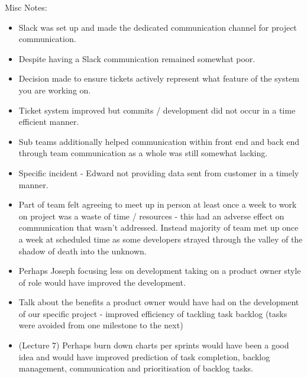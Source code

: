 \documentclass{l3proj}
\begin{document}
Misc Notes:
\begin{itemize}
\item Slack was set up and made the dedicated communication channel for project communication.
\item Despite having a Slack communication remained somewhat poor.
\item Decision made to ensure tickets actively represent what feature of the system you are working on.
\item Ticket system improved but commits / development did not occur in a time efficient manner.
\item Sub teams additionally helped communication within front end and back end through team communication as a whole was still somewhat lacking.
\item Specific incident - Edward not providing data sent from customer in a timely manner.
\item Part of team felt agreeing to meet up in person at least once a week to work on project was a waste of time / resources - this had an adverse effect on communication that wasn’t addressed. Instead majority of team met up once a week at scheduled time as some developers strayed through the valley of the shadow of death into the unknown.
\item Perhaps Joseph focusing less on development taking on a product owner style of role would have improved the development.
\item Talk about the benefits a product owner would have had on the development of our specific project - improved efficiency of tackling task backlog (tasks were avoided from one milestone to the next)
\item (Lecture 7) Perhaps burn down charts per sprints would have been a good idea and would have improved prediction of task completion, backlog management, communication and prioritisation of backlog tasks.
\end{itemize}

\end{document}
